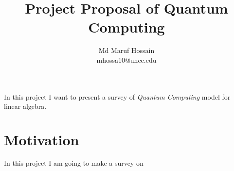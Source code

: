 \documentclass[a4paper,11pt]{article}
\title{Project Proposal of Quantum Computing}
\author[]{Md Maruf Hossain \\ mhossa10@uncc.edu}
\affil[]{Department of Computer Science, UNC Charlotte}
\date{}
\begin{document}
\maketitle

In this project I want to present a survey of \textit{Quantum Computing} model for linear algebra. 
\section{Motivation}
In this project I am going to make a survey on 



\end{document}
